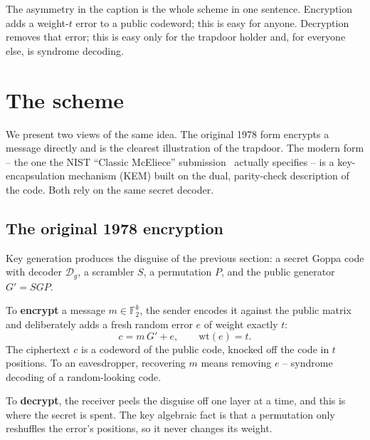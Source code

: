 The asymmetry in the caption is the whole scheme in one sentence. Encryption adds a weight-$t$ error to a public codeword; this is easy for anyone. Decryption removes that error; this is easy only for the trapdoor holder and, for everyone else, is syndrome decoding.

\section{The scheme}

We present two views of the same idea. The original 1978 form encrypts a message directly and is the clearest illustration of the trapdoor. The modern form -- the one the NIST ``Classic McEliece'' submission~\cite{classicmceliece} actually specifies -- is a key-encapsulation mechanism (KEM) built on the dual, parity-check description of the code. Both rely on the same secret decoder.

\subsection{The original 1978 encryption}

Key generation produces the disguise of the previous section: a secret Goppa code with decoder $\mathcal{D}_g$, a scrambler $S$, a permutation $P$, and the public generator $G' = SGP$.

To \textbf{encrypt} a message $m \in \mathbb{F}_2^k$, the sender encodes it against the public matrix and deliberately adds a fresh random error $e$ of weight exactly $t$:
\[
c = m\,G' + e , \qquad \mathrm{wt}(e) = t .
\]
The ciphertext $c$ is a codeword of the public code, knocked off the code in $t$ positions. To an eavesdropper, recovering $m$ means removing $e$ -- syndrome decoding of a random-looking code.

To \textbf{decrypt}, the receiver peels the disguise off one layer at a time, and this is where the secret is spent. The key algebraic fact is that a permutation only reshuffles the error's positions, so it never changes its weight.

